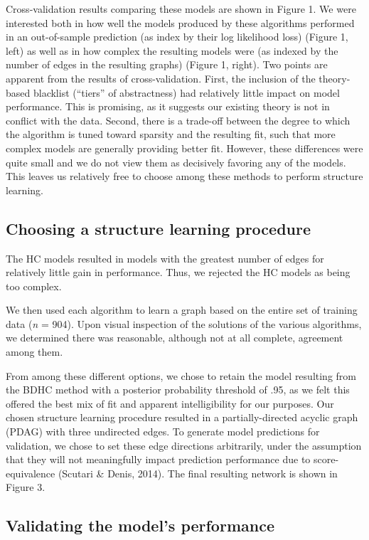 \documentclass[10pt, letterpaper]{article}
\begin{document}
Cross-validation results comparing these models are shown in Figure 1.
We were interested both in how well the models produced by these
algorithms performed in an out-of-sample prediction (as index by their
log likelihood loss) (Figure 1, left) as well as in how complex the
resulting models were (as indexed by the number of edges in the
resulting graphs) (Figure 1, right). Two points are apparent from the
results of cross-validation. First, the inclusion of the theory-based
blacklist (``tiers'' of abstractness) had relatively little impact on
model performance. This is promising, as it suggests our existing theory
is not in conflict with the data. Second, there is a trade-off between
the degree to which the algorithm is tuned toward sparsity and the
resulting fit, such that more complex models are generally providing
better fit. However, these differences were quite small and we do not
view them as decisively favoring any of the models. This leaves us
relatively free to choose among these methods to perform structure
learning.

\subsection{Choosing a structure learning
procedure}\label{choosing-a-structure-learning-procedure}

The HC models resulted in models with the greatest number of edges for
relatively little gain in performance. Thus, we rejected the HC models
as being too complex.

We then used each algorithm to learn a graph based on the entire set of
training data (\emph{n} = 904). Upon visual inspection of the solutions
of the various algorithms, we determined there was reasonable, although
not at all complete, agreement among them.

From among these different options, we chose to retain the model
resulting from the BDHC method with a posterior probability threshold of
.95, as we felt this offered the best mix of fit and apparent
intelligibility for our purposes. Our chosen structure learning
procedure resulted in a partially-directed acyclic graph (PDAG) with
three undirected edges. To generate model predictions for validation, we
chose to set these edge directions arbitrarily, under the assumption
that they will not meaningfully impact prediction performance due to
score-equivalence (Scutari \& Denis, 2014). The final resulting network
is shown in Figure 3.

\subsection{Validating the model's
performance}\label{validating-the-models-performance}
\end{document}
